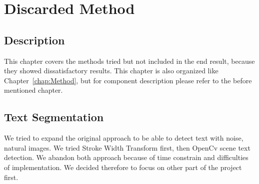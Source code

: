 \documentclass[Report.tex]{subfiles}
\begin{document}
\chapter{Discarded Method}
\label{chap:Discarded Method}
\section{Description}
This chapter covers the methods tried but not included in the end result,
because they showed dissatisfactory results. This chapter is also organized
like Chapter~\ref{chap:Method}, but for component description please refer to the before mentioned chapter.

\section{Text Segmentation}
We tried to expand the original approach to be able to detect text with noise, natural images. We tried Stroke Width Transform first, then OpenCv scene text detection. We abandon both approach because of time constrain and difficulties of implementation. We decided therefore to focus on other part of the project first. 
\end{document}
